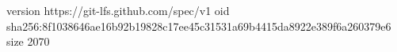 version https://git-lfs.github.com/spec/v1
oid sha256:8f1038646ae16b92b19828c17ee45c31531a69b4415da8922e389f6a260379e6
size 2070
